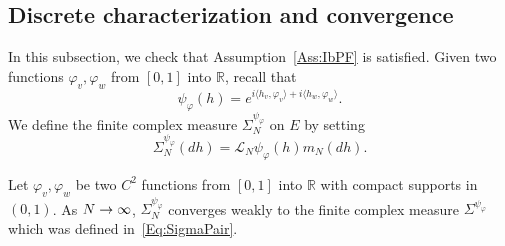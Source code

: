 \documentclass[AHL,Unicode,longabstracts]{cedram}
\theoremstyle{plain}
\newcommand{\cL}{\mathcal{L}}
\newcommand{\R}{\mathbb{R}}
\renewcommand*{\to}{\mathchoice{\longrightarrow}{\rightarrow}{\rightarrow}{\rightarrow}}
\begin{document}
\subsection{Discrete characterization and convergence}

In this subsection, we check that Assumption~\ref{Ass:IbPF} is satisfied. Given two functions $\varphi_v,\varphi_w$ from $[0,1]$ into $\R$, recall that
\[
\psi_\varphi(h)= e^{i \langle h_v,\varphi_v\rangle+i\langle h_w,\varphi_w\rangle}.
\]
We define the finite complex measure $ \Sigma^{\psi_\varphi}_N$ on $E$ by setting
\begin{equation}
\Sigma^{\psi_\varphi}_N(dh) =\cL_N \psi_\varphi(h)m_N(dh).
\end{equation}

\begin{prop}\label{Prop:DiscreteIbPFPair}
Let $\varphi_v,\varphi_w$ be two $C^2$ functions from $[0,1]$ into $\R$ with compact supports in $(0,1)$. As $N\to\infty$, $ \Sigma^{\psi_\varphi}_N$ converges weakly to the finite complex measure $\Sigma^{\psi_\varphi}$ which was defined in~\eqref{Eq:SigmaPair}.
\end{prop}
\end{document}
